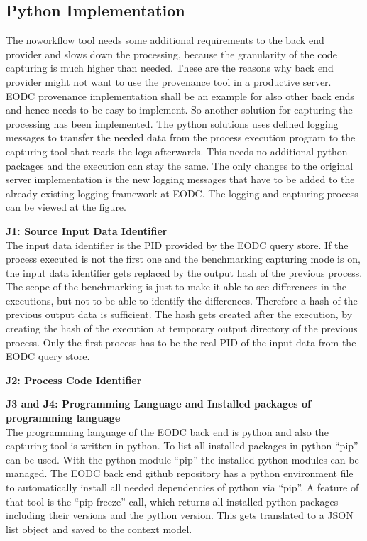 \documentclass[draft,final]{vutinfth} %
\begin{document}
\subsection{Python Implementation}\label{Implementation:Python Implementation}
The noworkflow tool needs some additional requirements to the back end provider and slows down the processing, because the granularity of the code capturing is much higher than needed. These are the reasons why back end provider might not want to use the provenance tool in a productive server. EODC provenance implementation shall be an example for also other back ends and hence needs to be easy to implement. So another solution for capturing the processing has been implemented. 
The python solutions uses defined logging messages to transfer the needed data from the process execution program to the capturing tool that reads the logs afterwards. This needs no additional python packages and the execution can stay the same. The only changes to the original server implementation is the new logging messages that have to be added to the already existing logging framework at EODC. The logging and capturing process can be viewed at the  figure. 


\textbf{J1:  Source Input Data Identifier} \\
The input data identifier is the PID provided by the EODC query store. 
If the process executed is not the first one and the benchmarking capturing mode is on, the input data identifier gets replaced by the output hash of the previous process. The scope of the benchmarking is just to make it able to see differences in the executions, but not to be able to identify the differences. Therefore a hash of the previous output data is sufficient. The hash gets created after the execution, by creating the hash of the execution at temporary output directory of the previous process. Only the first process has to be the real PID of the input data from the EODC query store.

\textbf{J2: Process Code Identifier} \\

\textbf{J3 and J4: Programming Language and  Installed packages of programming language} \\
The programming language of the EODC back end is python and also the capturing tool is written in python. To list all installed packages in python “pip” can be used. With the python module “pip” the installed python modules can be managed. The EODC back end github repository has a python environment file to automatically install all needed dependencies of python via “pip”. A feature of that tool is the “pip freeze” call, which returns all installed python packages including their versions and the python version. This gets translated to a JSON list object and saved to the context model.    
\end{document}
